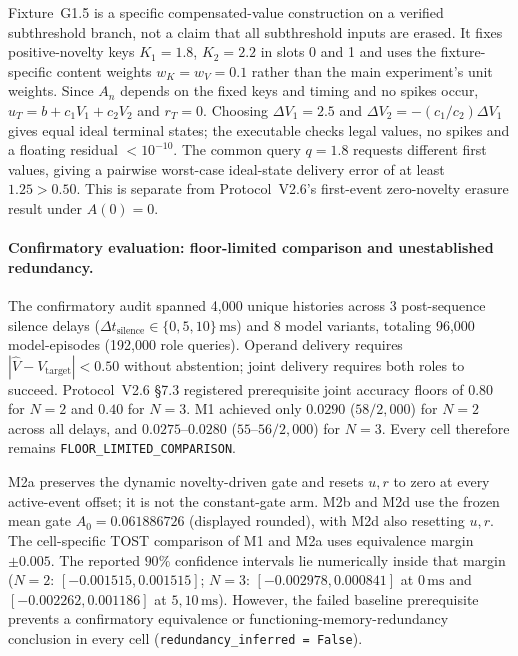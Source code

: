 \documentclass{article}
\begin{document}
Fixture~G1.5 is a specific compensated-value construction on a verified
subthreshold branch, not a claim that all subthreshold inputs are erased.
It fixes positive-novelty keys $K_1=1.8$, $K_2=2.2$ in slots 0 and 1
and uses the fixture-specific content weights $w_K=w_V=0.1$ rather than
the main experiment's unit weights. Since $A_n$ depends on the fixed keys
and timing and no spikes occur, $u_T=b+c_1V_1+c_2V_2$ and $r_T=0$.
Choosing $\Delta V_1=2.5$ and
$\Delta V_2=-(c_1/c_2)\Delta V_1$ gives equal ideal terminal states;
the executable checks legal values, no spikes and a floating residual
$<10^{-10}$. The common query $q=1.8$ requests different first values,
giving a pairwise worst-case ideal-state delivery error of at least
$1.25>0.50$. This is separate from Protocol~V2.6's first-event
zero-novelty erasure result under $A(0)=0$.

\paragraph{Confirmatory evaluation: floor-limited comparison and unestablished redundancy.}
The confirmatory audit spanned 4,000 unique histories across 3 post-sequence silence
delays ($\Delta t_{\text{silence}}\in\{0,5,10\}\,\text{ms}$) and 8 model variants,
totaling 96,000 model-episodes (192,000 role queries). Operand delivery requires
$|\hat V-V_{\mathrm{target}}|<0.50$ without abstention; joint delivery requires
both roles to succeed. Protocol~V2.6 \S7.3 registered prerequisite joint
accuracy floors of $0.80$ for $N=2$ and $0.40$ for $N=3$.
M1 achieved only $0.0290$ ($58/2{,}000$) for $N=2$ across all delays, and
$0.0275$--$0.0280$ ($55$--$56/2{,}000$) for $N=3$.
Every cell therefore remains \texttt{FLOOR\_LIMITED\_COMPARISON}.

M2a preserves the dynamic novelty-driven gate and resets $u,r$ to zero
at every active-event offset; it is not the constant-gate arm.
M2b and M2d use the frozen mean gate $A_0=0.061886726$ (displayed rounded),
with M2d also resetting $u,r$. The cell-specific TOST comparison of
M1 and M2a uses equivalence margin $\pm0.005$. The reported $90\%$
confidence intervals lie numerically
inside that margin ($N=2$: $[-0.001515,0.001515]$;
$N=3$: $[-0.002978,0.000841]$ at $0\,\text{ms}$ and
$[-0.002262,0.001186]$ at $5,10\,\text{ms}$).
However, the failed baseline prerequisite prevents a confirmatory
equivalence or functioning-memory-redundancy conclusion in every cell
(\texttt{redundancy\_inferred = False}).
\end{document}
